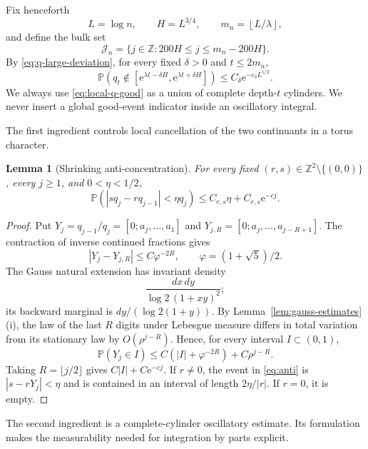 \documentclass[11pt,a4paper]{amsart}
\newtheorem{lemma}[theorem]{Lemma}
\theoremstyle{definition}
\theoremstyle{remark}
\newcommand{\Z}{\mathbb Z}
\newcommand{\Pp}{\mathbb P}
\newcommand{\e}{\mathrm e}
\begin{document}
Fix henceforth
\begin{equation}\label{eq:scales}
 L=\log n,\qquad H=L^{3/4},\qquad
 m_n=\left\lfloor L/\lambda\right\rfloor,
\end{equation}
and define the bulk set
\begin{equation}\label{eq:bulk}
 \mathcal J_n=\{j\in\Z:200H\le j\le m_n-200H\}.
\end{equation}
By \eqref{eq:q-large-deviation}, for every fixed $\delta>0$ and
$t\le2m_n$,
\begin{equation}\label{eq:local-q-good}
 \Pp(q_t\notin[\e^{\lambda t-\delta H},
                    \e^{\lambda t+\delta H}])
 \le C_\delta \e^{-c_\delta L^{1/2}}.
\end{equation}
We always use \eqref{eq:local-q-good} as a union of complete depth-$t$
cylinders.  We never insert a global good-event indicator inside an
oscillatory integral.

The first ingredient controls local cancellation of the two continuants in a
torus character.

\begin{lemma}[Shrinking anti-concentration]\label{lem:anti}
For every fixed $(r,s)\in\Z^2\setminus\{(0,0)\}$, every $j\ge1$, and
$0<\eta<1/2$,
\begin{equation}\label{eq:anti}
 \Pp(|sq_j-rq_{j-1}|<\eta q_j)
 \le C_{r,s}\eta+C_{r,s}\e^{-cj}.
\end{equation}
\end{lemma}

\begin{proof}
Put $Y_j=q_{j-1}/q_j=[0;a_j,\ldots,a_1]$ and
$Y_{j,R}=[0;a_j,\ldots,a_{j-R+1}]$.  The contraction of inverse continued
fractions gives
\[
 |Y_j-Y_{j,R}|\le C\varphi^{-2R},
 \qquad \varphi=(1+\sqrt5)/2.
\]
The Gauss natural extension has invariant density
\[
 \frac{dx\,dy}{\log2\,(1+xy)^2};
\]
its backward marginal is $dy/(\log2(1+y))$.  By
Lemma~\ref{lem:gauss-estimates}(i), the law of the last $R$ digits under
Lebesgue measure differs in total variation from its stationary law by
$O(\rho^{j-R})$.  Hence, for every interval $I\subset(0,1)$,
\[
 \Pp(Y_j\in I)\le C(|I|+\varphi^{-2R})+C\rho^{j-R}.
\]
Taking $R=\lfloor j/2\rfloor$ gives $C|I|+C\e^{-cj}$.  If $r\ne0$, the event
in \eqref{eq:anti} is $|s-rY_j|<\eta$ and is contained in an interval of
length $2\eta/|r|$.  If $r=0$, it is empty.
\end{proof}

The second ingredient is a complete-cylinder oscillatory estimate.  Its
formulation makes the measurability needed for integration by parts explicit.
\end{document}
